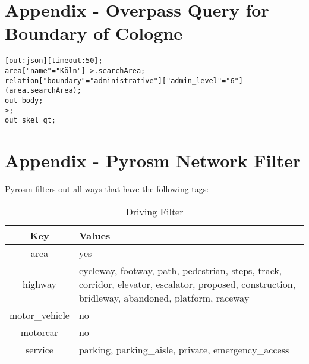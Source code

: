 \clearpage
\section{Appendix - Overpass Query for Boundary of Cologne}
\label{app:overpass_query}
\begin{verbatim}
[out:json][timeout:50];
area["name"="Köln"]->.searchArea;
relation["boundary"="administrative"]["admin_level"="6"](area.searchArea);
out body;
>;
out skel qt;
\end{verbatim}

\section{Appendix - Pyrosm Network Filter}
\label{app:pyrosm_network_filter}

Pyrosm filters out all ways that have the following tags:

\begin{table}[h]
\centering
\caption{Driving Filter}
\begin{tabular}{|c|p{10cm}|}
\hline
\textbf{Key}         & \textbf{Values}                                                                                                             \\ \hline
area                 & yes                                                                                                                         \\ \hline
highway              & cycleway, footway, path, pedestrian, steps, track, corridor, elevator, escalator, proposed, construction, bridleway, abandoned, platform, raceway \\ \hline
motor\_vehicle       & no                                                                                                                          \\ \hline
motorcar             & no                                                                                                                          \\ \hline
service              & parking, parking\_aisle, private, emergency\_access                                                                         \\ \hline
\end{tabular}
\end{table}



